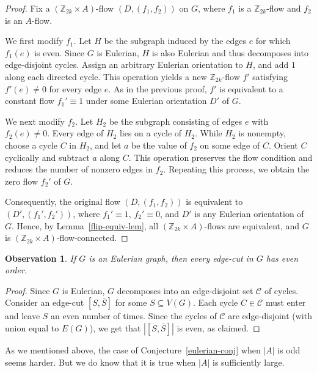 \documentclass[a4paper,12pt]{article}
\theoremstyle{plain}
\newtheorem{obs}[theorem]{Observation}
\theoremstyle{definition}
\begin{document}
\begin{proof}
Fix a $(\mathbb{Z}_{2k}\times A)$-flow $(D,(f_1,f_2))$ on $G$, where $f_1$ is a $\mathbb{Z}_{2k}$-flow and $f_2$ is an $A$-flow.

We first modify $f_1$. Let $H$ be the subgraph induced by the edges $e$ for which $f_1(e)$ is even. Since $G$ is Eulerian, $H$ is also Eulerian and thus decomposes into edge-disjoint cycles. Assign an arbitrary Eulerian orientation to $H$, and add $1$ along each directed cycle. This operation yields a new $\mathbb{Z}_{2k}$-flow $f'$ satisfying $f'(e)\neq 0$ for every edge $e$. As in the previous proof, $f'$ is equivalent to a constant flow $f_1'\equiv 1$ under some Eulerian orientation $D'$ of $G$.

We next modify $f_2$. Let $H_2$ be the subgraph consisting of edges $e$ with $f_2(e)\neq 0$. Every edge of $H_2$ lies on a cycle of $H_2$. While $H_2$ is nonempty, choose a cycle $C$ in $H_2$, and let $a$ be the value of $f_2$ on some edge of $C$. Orient $C$ cyclically and subtract $a$ along $C$. This operation preserves the flow condition and reduces the number of nonzero edges in $f_2$. Repeating this process, we obtain the zero flow $f_2'$ of $G$.

Consequently, the original flow $(D,(f_1,f_2))$ is equivalent to $(D',(f_1',f_2'))$, where $f_1'\equiv 1$, $f_2'\equiv 0$, and $D'$ is any Eulerian orientation of $G$. Hence, 
by Lemma~\ref{flip-equiv-lem},
all $(\mathbb{Z}_{2k}\times A)$-flows are equivalent, and $G$ is $(\mathbb{Z}_{2k}\times A)$-flow-connected.
\end{proof}


\begin{obs}
\label{eulerian-obs}
	If $G$ is an Eulerian graph, then every edge-cut in $G$ has even order.
\end{obs}
\begin{proof}
	Since $G$ is Eulerian, $G$ decomposes into an edge-disjoint set $\mathcal{C}$ of cycles.  Consider an
	edge-cut $[S,\overline{S}]$ for some $S\subseteq V(G)$.  Each cycle $C\in \mathcal{C}$ must enter and
	leave $S$ an even number of times.  Since the cycles of $\mathcal{C}$ are edge-disjoint (with union
	equal to $E(G)$), we get that $|[S,\overline{S}]|$ is even, as claimed.
\end{proof}

As we mentioned above, the case of Conjecture~\ref{eulerian-conj} when $|A|$ is odd seems harder.  But we do know that it is true when $|A|$
is sufficiently large.
\end{document}
